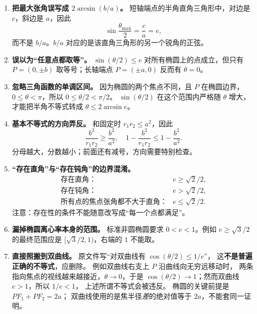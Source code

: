 \begin{trapbox}
\begin{enumerate}
    \item \textbf{把最大张角误写成 $2\arcsin(b/a)$。}
    短轴端点的半角直角三角形中，对边是 $c$，斜边是 $a$，因此
    \[
    \sin\frac{\theta_{\max}}2=\frac ca=e,
    \]
    而不是 $b/a$。$b/a$ 对应的是该直角三角形的另一个锐角的正弦。

    \item \textbf{误以为“任意点都取等”。}
    $\sin(\theta/2)\le e$ 对所有椭圆上的点成立，但只有
    $P=(0,\pm b)$ 取等号；长轴端点 $P=(\pm a,0)$ 反而有 $\theta=0$。

    \item \textbf{忽略三角函数的单调区间。}
    因为椭圆的两个焦点不同，且 $P$ 在椭圆边界，
    $0\le\theta<\pi$，所以 $0\le\theta/2<\pi/2$。
    $\sin(\theta/2)$ 在这个范围内严格随 $\theta$ 增大，
    才能把半角不等式转成 $\theta\le2\arcsin e$。

    \item \textbf{基本不等式的方向弄反。}
    和固定时 $r_1r_2\le a^2$，因此
    \[
    \frac{b^2}{r_1r_2}\ge\frac{b^2}{a^2},
    \quad
    1-\frac{b^2}{r_1r_2}\le1-\frac{b^2}{a^2}.
    \]
    分母越大，分数越小；前面还有减号，方向需要特别检查。

    \item \textbf{“存在直角”与“存在钝角”的边界混淆。}
    \[
    \begin{array}{ll}
    \text{存在直角：}&e\ge\sqrt2/2,\\
    \text{存在钝角：}&e>\sqrt2/2,\\
    \text{所有点的焦点张角都不大于直角：}&e\le\sqrt2/2.
    \end{array}
    \]
    注意：存在性的条件不能随意改写成“每一个点都满足”。

    \item \textbf{漏掉椭圆离心率本身的范围。}
    标准非圆椭圆要求 $0<e<1$。例如 $e\ge\sqrt3/2$
    的最终范围应是 $[\sqrt3/2,1)$，右端的 $1$ 不能取。

    \item \textbf{直接照搬到双曲线。}
    原文件写“对双曲线有 $\cos(\theta/2)\le1/e$”，
    这\textbf{不是普遍正确的不等式}，应删除。
    例如双曲线右支上 $P$ 沿曲线向无穷远移动时，
    两条指向焦点的视线越来越接近，$\theta\to0$，于是
    $\cos(\theta/2)\to1$；然而双曲线 $e>1$，所以 $1/e<1$，
    上述所谓不等式会被违反。
    椭圆的关键前提是 $PF_1+PF_2=2a$；
    双曲线使用的是焦半径\emph{差}的绝对值等于 $2a$，不能套同一证明。
\end{enumerate}
\end{trapbox}
